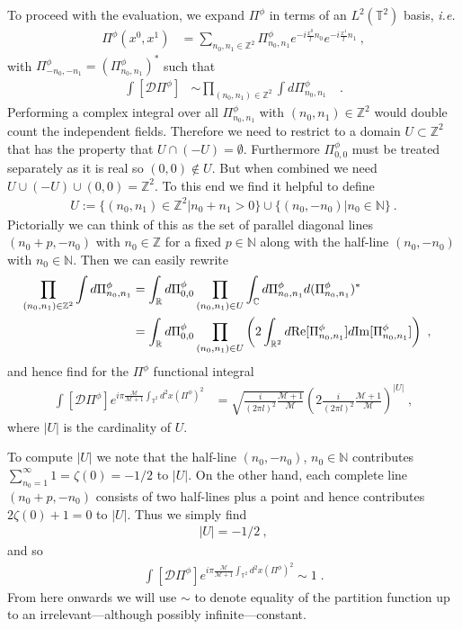 \documentclass[11pt]{article}
\numberwithin{equation}{section}
\begin{document}
To proceed with the evaluation, we expand $\Pi^\phi$ in terms of an $L^2(\mathbb{T}^2)$  basis, {\it i.e.}
\begin{align}
\Pi^\phi(x^0,x^1)&=\sum_{n_0,n_1\in\mathbb{Z}^2}\Pi^\phi_{n_0,n_1}e^{-i\frac{x^0}{l}n_0}e^{-i\frac{x^1}{l}n_1}\ ,
    \end{align} 
with $\Pi^\phi_{-n_0,-n_1}=(\Pi^\phi_{n_0,n_1})^*$ such that 
\begin{align}
\int [\mathcal D\Pi^\phi]&\sim \prod_{(n_0,n_1)\in \mathbb{Z}^2}\int d\Pi^\phi_{n_0,n_1}\quad.
\end{align}
Performing a complex integral  over all $\Pi^\phi_{n_0,n_1} $ with $(n_0,n_1)\in {\mathbb Z}^2$ would double count the independent fields. Therefore we need to restrict to a domain 
$U\subset\mathbb{Z}^2$ that has the property that $U\cap (-U)=\emptyset$. Furthermore $\Pi^\phi_{0,0}$ must be treated separately as it is real so $(0,0)\notin U$. But when combined we need $U\cup (-U)\cup(0,0)={\mathbb Z}^2$. To this end we find it helpful to define
\begin{align}
\label{Uset}
U:=\{(n_0,n_1)\in\mathbb{Z}^2| n_0+n_1> 0\}\cup\{(n_0,-n_0)| n_0\in \mathbb N \}\ .
\end{align}
Pictorially we can think of this as the set of parallel diagonal lines $(n_0+p,-n_0)$ with $n_0\in \mathbb Z$ for a fixed $p\in\mathbb N$  along with the half-line $(n_0,-n_0)$ with $n_0\in \mathbb N$. Then  we can easily rewrite 
\begin{align}
\label{PathIntegralMeasure}
\prod_{(n_0,n_1)\in \mathbb{Z}^2}\int d\Pi^\phi_{n_0,n_1} &=\int_{\mathbb{R}}d\Pi^\phi_{0,0} \prod_{(n_0,n_1)\in U}\int_{\mathbb{C}}d\Pi^\phi_{n_0,n_1}d(\Pi^\phi_{n_0,n_1})^*\cr
&= \int_{\mathbb{R}}d\Pi^\phi_{0,0}  \prod_{(n_0,n_1)\in U}\left(2\int_{\mathbb{R}^2}d\mathrm {Re}[\Pi^\phi_{n_0,n_1}]d\mathrm{Im}[\Pi^\phi_{n_0,n_1}]\right)\ ,
\end{align}
and hence find for the $\Pi^\phi$ functional integral
\begin{align}
\int [\mathcal D\Pi^\phi] e^{i\pi\frac{\mathcal M}{\mathcal M+1}\int_{\mathbb T^2}d^2x(\Pi^\phi)^2}&=\sqrt{\frac{i}{(2\pi l)^2}\frac{\mathcal M+1}{\mathcal M}} \left(2\frac{i}{(2\pi l)^2}\frac{\mathcal M+1}{\mathcal M}\right)^{|U|}\;,
\end{align}
where  $|U|$ is the cardinality of $U$. 

To compute $|U|$ we note that the half-line $(n_0,-n_0)$, $n_0\in \mathbb N$ contributes $\sum_{n_0=1}^\infty 1=\zeta(0)=-1/2$ to $|U|$. On the other hand, each complete line $(n_0+p,-n_0)$ consists of two half-lines plus a point and hence contributes $2\zeta(0)+1=0$ to $|U|$. Thus we simply find
\begin{align}
\label{Uregularized}
	|U|=-1/2\ ,
\end{align}
and so
\begin{align}\label{regularised}
\int [\mathcal D\Pi^\phi] e^{i\pi\frac{\mathcal M}{\mathcal M+1}\int_{\mathbb T^2}d^2x(\Pi^\phi)^2}\sim 1\;.
\end{align}
From here onwards we will use $\sim$ to denote equality of the partition function up to an irrelevant---although possibly infinite---constant.
\end{document}
